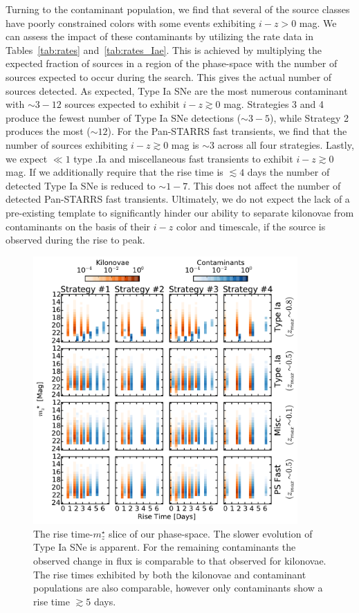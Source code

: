 Turning to the contaminant population, we find that several of the source classes have poorly constrained colors with some events exhibiting $i-z > 0$ mag. We can assess the impact of these contaminants by utilizing the rate data in Tables~\ref{tab:rates} and~\ref{tab:rates_Iae}. This is achieved by multiplying the expected fraction of sources in a region of the phase-space with the number of sources expected to occur during the search. This gives the actual number of sources detected. As expected, Type Ia SNe are the most numerous contaminant with $\sim3-12$ sources expected to exhibit $i-z\gtrsim0$ mag. Strategies 3 and 4 produce the fewest number of Type Ia SNe detections ($\sim 3-5$), while Strategy 2 produces the most ($\sim 12$). For the Pan-STARRS fast transients, we find that the number of sources exhibiting $i-z\gtrsim0$ mag is $\sim3$ across all four strategies. Lastly, we expect $\ll1$ type .Ia and miscellaneous fast transients to exhibit $i-z\gtrsim0$ mag. If we additionally require that the rise time is $\lesssim 4$ days the number of detected Type Ia SNe is reduced to $\sim1-7$. This does not affect the number of detected Pan-STARRS fast transients. Ultimately, we do not expect the lack of a pre-existing template to significantly hinder our ability to separate kilonovae from contaminants on the basis of their $i-z$ color and timescale, if the source is observed during the rise to peak. 

\begin{figure}[t!]
\centering
\includegraphics[width=0.9\textwidth]{./figs/chapter2/ch2_f15.pdf}
\caption{The rise time-$m^{\star}_z$ slice of our phase-space. The slower evolution of Type Ia SNe is apparent. For the remaining contaminants the observed change in flux is comparable to that observed for kilonovae. The rise times exhibited by both the kilonovae and contaminant populations are also comparable, however only contaminants show a rise time $\gtrsim 5$ days.}
\label{fig:phaserisediff_df}
\end{figure}
   
